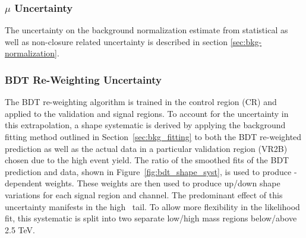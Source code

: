 \subsubsection{$\mu$ Uncertainty}
The uncertainty on the background normalization estimate from statistical as well as non-closure related uncertainty is described in section \ref{sec:bkg-normalization}.

\subsubsection{BDT Re-Weighting Uncertainty}
The BDT re-weighting algorithm is trained in the control region (CR) and applied to the validation and signal regions.
To account for the uncertainty in this extrapolation, a shape systematic is derived by applying the background fitting method outlined in Section~\ref{sec:bkg_fitting} to both the BDT re-weighted prediction as well as the actual data in a particular validation region (VR2B) chosen due to the high event yield.
The ratio of the smoothed fits of the BDT prediction and data, shown in Figure~\ref{fig:bdt_shape_syst}, is used to produce \mvh-dependent weights.
These weights are then used to produce up/down shape variations for each signal region and channel.
The predominant effect of this uncertainty manifests in the high \mvh\ tail.
To allow more flexibility in the likelihood fit, this systematic is split into two separate low/high mass regions below/above 2.5 TeV.

